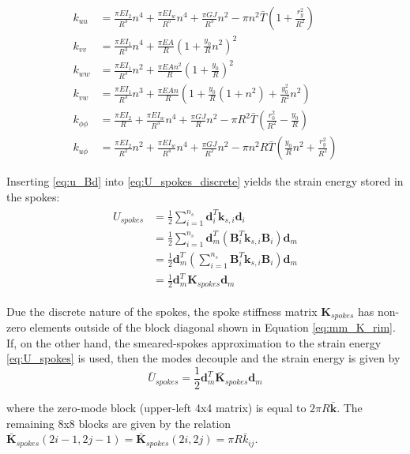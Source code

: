 \documentclass[\rootdir/thesis.tex]{subfiles}
\begin{document}
\begin{align*}
k_{uu} &= \frac{\pi EI_2}{R^3}n^4 + \frac{\pi EI_w}{R^5}n^4 + \frac{\pi GJ}{R^3}n^2 - \pi n^2 \bar{T}\left(1 + \frac{r_y^2}{R^2}\right)\\
k_{vv} &= \frac{\pi EI_1}{R^3}n^4 + \frac{\pi EA}{R}\left(1 + \frac{y_0}{R}n^2 \right)^2\\
k_{ww} &= \frac{\pi EI_1}{R^3}n^2 + \frac{\pi EA n^2}{R}\left(1 + \frac{y_0}{R} \right)^2\\
k_{vw} &= \frac{\pi EI_1}{R^3}n^3 + \frac{\pi EA n}{R}\left(1 + \frac{y_0}{R}(1+n^2) + \frac{y_0^2}{R^2}n^2\right)\\
k_{\phi\phi} &= \frac{\pi EI_2}{R} + \frac{\pi EI_w}{R^3}n^4 + \frac{\pi GJ}{R}n^2 - \pi R^2\bar{T}\left(\frac{r_0^2}{R^2}-\frac{y_0}{R}\right)\\
k_{u\phi} &= \frac{\pi EI_2}{R^2}n^2 + \frac{\pi EI_w}{R^4}n^4 + \frac{\pi GJ}{R^2}n^2 - \pi n^2 R \bar{T}\left(\frac{y_0}{R}n^2 + \frac{r_y^2}{R^2}\right)
\end{align*}

Inserting \eqref{eq:u_Bd} into \eqref{eq:U_spokes_discrete} yields the strain energy stored in the spokes:
\begin{align}
\label{eq:mm_U_spokes}
\begin{split}
U_{spokes} &= \frac{1}{2} \sum_{i=1}^{n_s} \mathbf{d}_i^T \mathbf{k}_{s,i} \mathbf{d}_i\\
&= \frac{1}{2} \sum_{i=1}^{n_s} \mathbf{d}_m^T \left(\mathbf{B}_i^T\mathbf{k}_{s, i}\mathbf{B}_i \right)\mathbf{d}_m\\
&= \frac{1}{2} \mathbf{d}_m^T \left(\sum_{i=1}^{n_s} \mathbf{B}_i^T\mathbf{k}_{s, i}\mathbf{B}_i \right) \mathbf{d}_m\\
&= \frac{1}{2} \mathbf{d}_m^T \mathbf{K}_{spokes} \mathbf{d}_m
\end{split}
\end{align}

Due the discrete nature of the spokes, the spoke stiffness matrix $\mathbf{K}_{spokes}$ has non-zero elements outside of the block diagonal shown in Equation \eqref{eq:mm_K_rim}. If, on the other hand, the smeared-spokes approximation to the strain energy \eqref{eq:U_spokes} is used, then the modes decouple and the strain energy is given by
\begin{equation}
\label{eq:U_spokes_smeared}
\bar{U}_{spokes} = \frac{1}{2} \mathbf{d}_m^T \bar{\mathbf{K}}_{spokes} \mathbf{d}_m
\end{equation}

where the zero-mode block (upper-left 4x4 matrix) is equal to $2\pi R\mathbf{\bar{k}}$. The remaining 8x8 blocks are given by the relation $\mathbf{\bar{K}}_{spokes}(2i-1, 2j-1) = \mathbf{\bar{K}}_{spokes}(2i, 2j) = \pi R \bar{k}_{ij}$.
\end{document}
